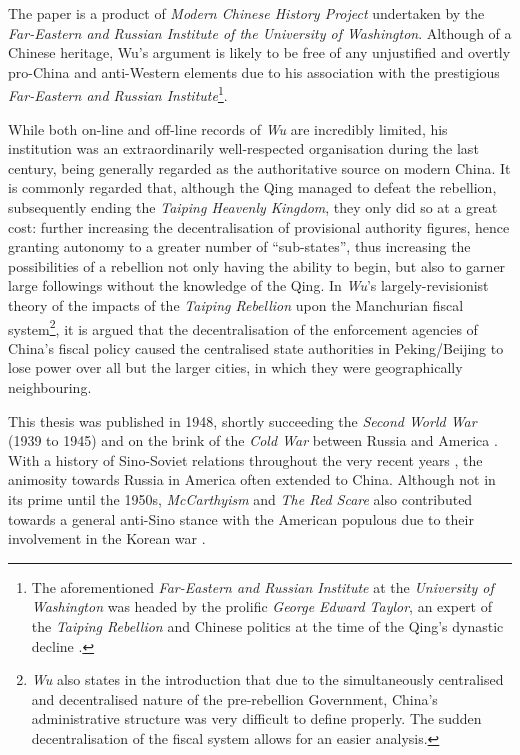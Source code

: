 \documentclass[a4paper,oneside]{article}
\begin{document}

        The paper is a product of \textit{Modern Chinese History Project} undertaken by the \textit{Far-Eastern and Russian Institute of the University of Washington}. Although of a Chinese heritage, Wu's argument is likely to be free of any unjustified and overtly pro-China and anti-Western elements due to his association with the prestigious \textit{Far-Eastern and Russian Institute}\footnote{The aforementioned \textit{Far-Eastern and Russian Institute} at the \textit{University of Washington} was headed by the prolific \textit{George Edward Taylor}, an expert of the \textit{Taiping Rebellion} and Chinese politics at the time of the Qing's dynastic decline \autocite{Taylor:1999}.}.

        While both on-line and off-line records of \textit{Wu} are incredibly limited, his institution was an extraordinarily well-respected organisation during the last century, being generally regarded as the authoritative source on modern China. It is commonly regarded that, although the Qing managed to defeat the rebellion, subsequently ending the \textit{Taiping Heavenly Kingdom}, they only did so at a great cost: further increasing the decentralisation of provisional authority figures, hence granting autonomy to a greater number of ``sub-states'', thus increasing the possibilities of a rebellion not only having the ability to begin, but also to garner large followings without the knowledge of the Qing. In \textit{Wu}'s largely-revisionist theory of the impacts of the \textit{Taiping Rebellion} upon the Manchurian fiscal system\footnote{\textit{Wu} also states in the introduction that due to the simultaneously centralised and decentralised nature of the pre-rebellion Government, China's administrative structure was very difficult to define properly. The sudden decentralisation of the fiscal system allows for an easier analysis.}, it is argued that the decentralisation of the enforcement agencies of China's fiscal policy caused the centralised state authorities in Peking/Beijing to lose power over all but the larger cities, in which they were geographically neighbouring.

        This thesis was published in 1948, shortly succeeding the \textit{Second World War} (1939 to 1945) and on the brink of the \textit{Cold War} between Russia and America \autocite{Leffler:2010}. With a history of Sino-Soviet relations throughout the very recent years \autocite{Garver:1989}, the animosity towards Russia in America often extended to China. Although not in its prime until the 1950s, \textit{McCarthyism} and \textit{The Red Scare} also contributed towards a general anti-Sino stance with the American populous due to their involvement in the Korean war \autocite{Schrecker:1998}.
\end{document}
